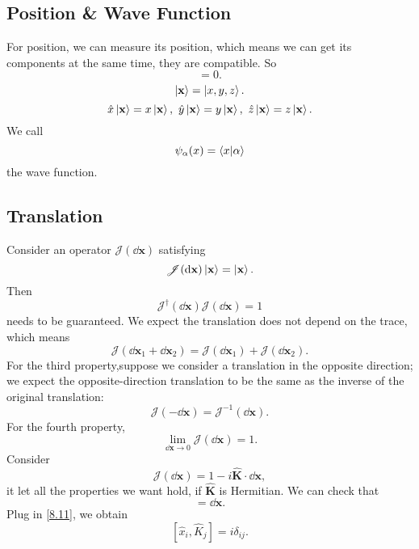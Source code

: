 \documentclass{article}
\theoremstyle{1}
\begin{document}
\subsection{Position \& Wave Function}
For position, we can measure its position, which means we can get its components at the same time, they are compatible. So 
\begin{equation}
    [\hat{x}_i,\hat{x}_j]=0.
\end{equation}
\begin{equation}
    \ket{\mathbf{x}}=\ket{x,y,z}.
\end{equation}
\begin{equation}
    \hat{x}\ket{\mathbf{x}}=x\ket{\mathbf{x}},\ \hat{y}\ket{\mathbf{x}}=y\ket{\mathbf{x}},\ \hat{z}\ket{\mathbf{x}}=z\ket{\mathbf{x}}.
\end{equation}
We call 
\begin{equation}
    \psi_{\alpha}(x)=\braket{x}{\alpha}
\end{equation}
the wave function.
\subsection{Translation}
Consider an operator $\mathscr{J}(\dd{\mathbf{x}})$ satisfying
\begin{equation}
    \mathscr{J}(\dd{\mathbf{x}})\ket{\mathbf{x}}=\ket{\mathbf{x}}.
\end{equation}
Then 
\begin{equation}
    \mathscr{J}^\dagger(\dd{\mathbf{x}})\mathscr{J}(\dd{\mathbf{x}})=1
\end{equation}
needs to be guaranteed. We expect the translation does not depend on the trace, which means
\begin{equation}
    \mathscr{J}(\dd{\mathbf{x}}_1+\dd{\mathbf{x}}_2)=\mathscr{J}(\dd{\mathbf{x}}_1)+\mathscr{J}(\dd{\mathbf{x}}_2).
\end{equation}
For the third property,suppose we consider a translation in the opposite direction;
we expect the opposite-direction translation to be the same as the inverse of the
original translation:
\begin{equation}
    \mathscr{J}(-\dd{\mathbf{x}})=\mathscr{J}^{-1}(\dd{\mathbf{x}}).
\end{equation}
For the fourth property,
\begin{equation}
    \lim_{\dd{\mathbf{x}}\rightarrow0}\mathscr{J}(\dd{\mathbf{x}})=1.
\end{equation}
Consider
\begin{equation}\label{8.11}
    \mathscr{J}(\dd{\mathbf{x}})=1-i\hat{\mathbf{K}}\cdot\dd{\mathbf{x}},
\end{equation}
it let all the properties we want hold, if $\hat{\mathbf{K}}$ is Hermitian. We can check that 
\begin{equation}
    [\hat{\mathbf{x}},\mathscr{J}(\dd{\mathbf{x}})]=\dd{\mathbf{x}}.
\end{equation}
Plug in \eqref{8.11}, we obtain
\begin{equation}\label{8.13}
    [\hat{x}_i,\hat{K}_j]=i\delta_{ij}.
\end{equation}
\end{document}
